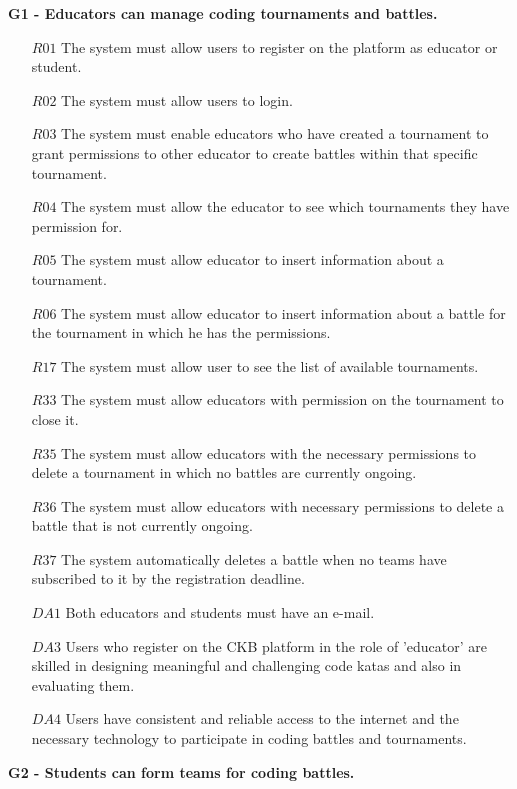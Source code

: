 \textbf{G1 - Educators can manage coding tournaments and battles.}
\begin{itemize}
    \item [$R01$] The system must allow users to register on the platform as educator or student.
    \item [$R02$]The system must allow users to login.
    \item [$R03$] The system must enable educators who have created a tournament to grant permissions to other
    educator to create battles within that specific tournament.
    \item [$R04$]The system must allow the educator to see which tournaments they have permission for.
    \item [$R05$] The system must allow educator to insert information about a tournament.
    \item [$R06$]The system must allow educator to insert information about a battle for the tournament in which
    he has the permissions.
    \item [$R17$]The system must allow user to see the list of available tournaments.
    \item [$R33$]The system must allow educators with permission on the tournament to close it.
    \item [$R35$] The system must allow educators with the necessary permissions to delete a tournament in which no battles are currently ongoing.
     \item [$R36$]The system must allow educators with necessary permissions to delete a battle  that is not currently ongoing.
      \item [$R37$]The system automatically deletes a battle when no teams have subscribed to it by the registration deadline.
\item [$DA1$]Both educators and students must have an e-mail.
\item [$DA3$] Users who register on the CKB platform in the role of 'educator' are skilled  in designing meaningful and challenging code katas and also in evaluating them.
\item [$DA4$] Users have consistent and reliable access to the internet and the necessary technology to participate in coding battles and tournaments.
   
\end{itemize}
  \textbf{G2 - Students can form teams for coding battles.}
